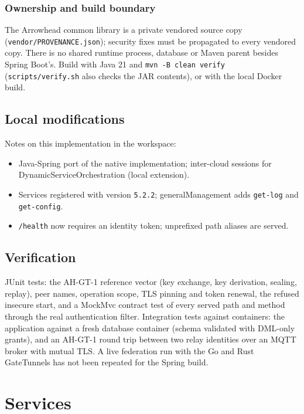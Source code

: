 \documentclass[a4paper]{arrowhead}
\begin{document}
\subsubsection{Ownership and build boundary}
The Arrowhead common library is a private vendored source copy (\texttt{vendor/\allowbreak{}PROVENANCE.json}); security fixes must be propagated to every vendored copy. There is no shared runtime process, database or Maven parent besides Spring Boot's. Build with Java 21 and \texttt{mvn -\allowbreak{}B clean verify} (\texttt{scripts/\allowbreak{}verify.sh} also checks the JAR contents), or with the local Docker build.

\subsection{Local modifications}
\label{sec:local}

Notes on this implementation in the workspace:
\begin{itemize}
  \item Java-Spring port of the native implementation; inter-cloud sessions for Dynamic\allowbreak{}Service\allowbreak{}Orchestration (local extension).
  \item Services registered with version \texttt{5.\allowbreak{}2.\allowbreak{}2}; generalManagement adds \texttt{get-log} and \texttt{get-config}.
  \item \texttt{/health} now requires an identity token; unprefixed path aliases are served.
\end{itemize}

\subsection{Verification}

JUnit tests: the AH-GT-1 reference vector (key exchange, key derivation, sealing, replay), peer names, operation scope, TLS pinning and token renewal, the refused insecure start, and a MockMvc contract test of every served path and method through the real authentication filter. Integration tests against containers: the application against a fresh database container (schema validated with DML-only grants), and an AH-GT-1 round trip between two relay identities over an MQTT broker with mutual TLS. A live federation run with the Go and Rust GateTunnels has not been repeated for the Spring build.

\newpage

\section{Services}
\label{sec:services}
\end{document}
